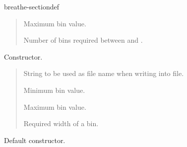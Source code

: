\documentclass[letterpaper,10pt,english]{sphinxmanual}
\begin{document}
\begin{fulllineitems}
\begin{sphinxuseclass}{breathe-sectiondef}
\begin{fulllineitems}
\begin{quote}
\begin{description}
\sphinxAtStartPar
Maximum bin value. 

\sphinxAtStartPar
Number of bins required between  and . 

\end{description}\end{quote}


\end{fulllineitems}


\begin{fulllineitems}
\label{\detokenize{Simulation/SimulationCodeDoc:_CPPv4N4Hist4HistERKNSt6stringEddd}}
\pysigstartsignatures
\pysigstartmultiline
{}
\pysigstopmultiline
\pysigstopsignatures
\sphinxAtStartPar
Constructor. 

\sphinxAtStartPar
\begin{quote}\begin{description}
\sphinxAtStartPar
String to be used as file name when writing into file. 

\sphinxAtStartPar
Minimum bin value. 

\sphinxAtStartPar
Maximum bin value. 

\sphinxAtStartPar
Required width of a bin. 

\end{description}\end{quote}


\end{fulllineitems}


\begin{fulllineitems}
\label{\detokenize{Simulation/SimulationCodeDoc:_CPPv4N4Hist4HistEv}}
\pysigstartsignatures
\pysigstartmultiline
{}
\pysigstopmultiline
\pysigstopsignatures
\sphinxAtStartPar
Default constructor. 


\end{fulllineitems}
\end{sphinxuseclass}
\end{fulllineitems}
\end{document}
